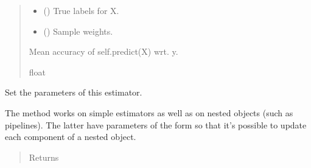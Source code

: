 \documentclass[letterpaper,10pt,english]{sphinxmanual}
\begin{document}
{\begin{fulllineitems}
\begin{fulllineitems}
\begin{quote}
\begin{description}
\begin{itemize}
\item {} 
 (\sphinxstyleliteralemphasis{\sphinxupquote{, }}\sphinxstyleliteralemphasis{\sphinxupquote{ (}}\sphinxstyleliteralemphasis{\sphinxupquote{(}}\sphinxstyleliteralemphasis{\sphinxupquote{, }}\sphinxstyleliteralemphasis{\sphinxupquote{)}}) \textendash{} True labels for X.

\item {} 
 (\sphinxstyleliteralemphasis{\sphinxupquote{, }}\sphinxstyleliteralemphasis{\sphinxupquote{ {[}}}\sphinxstyleliteralemphasis{\sphinxupquote{{]}}}\sphinxstyleliteralemphasis{\sphinxupquote{, }}) \textendash{} Sample weights.

\end{itemize}

\item[{Returns}] \leavevmode
{} \textendash{} Mean accuracy of self.predict(X) wrt. y.

\item[{Return type}] \leavevmode
float

\end{description}\end{quote}

\end{fulllineitems}


\begin{fulllineitems}
\label{\detokenize{api_reference:group_lasso.MultinomialGroupLasso.set_params}}
Set the parameters of this estimator.

The method works on simple estimators as well as on nested objects
(such as pipelines). The latter have parameters of the form
 so that it’s possible to update each
component of a nested object.
\begin{quote}\begin{description}
\item[{Returns}] \leavevmode



\end{description}
\end{quote}
\end{fulllineitems}
\end{fulllineitems}}
\end{document}
